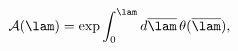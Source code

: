 \begin{equation}
{\cal A}(\lam)=\exp \int_0^\lam d\overline{\lam}\,\theta(\overline{\lam}),
\end{equation}

